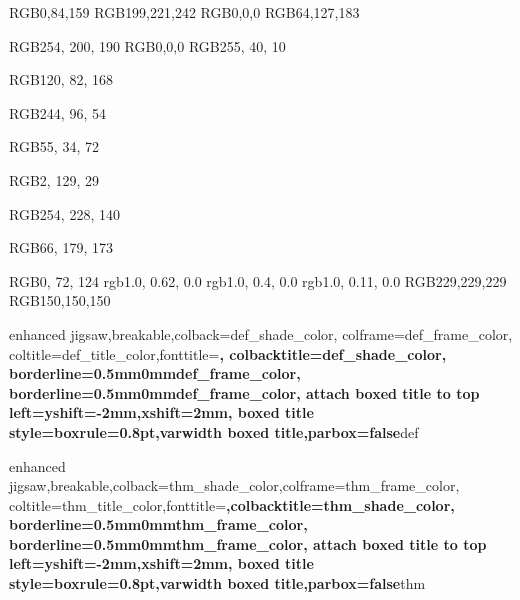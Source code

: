 
\definecolor{def_color}			{RGB}{0,84,159}
\definecolor{def_shade_color}	{RGB}{199,221,242}
\definecolor{def_title_color}	{RGB}{0,0,0}
\definecolor{def_frame_color}	{RGB}{64,127,183}


\definecolor{thm_shade_color}	{RGB}{254, 200, 190}
\definecolor{thm_title_color}	{RGB}{0,0,0}
\definecolor{thm_frame_color}	{RGB}{255, 40, 10}


\definecolor{Corollary_color}   {RGB}{120, 82, 168}

\definecolor{Remark_color}      {RGB}{244, 96, 54}

\definecolor{AltTheorem_color}  {RGB}{55, 34, 72}

\definecolor{Example_color}     {RGB}{2, 129, 29}

\definecolor{Lemma_color}       {RGB}{254, 228, 140}

\definecolor{Proposition_color} {RGB}{66, 179, 173}

\definecolor{indigo_dye}        {RGB}{0, 72, 124}
\definecolor{orangepeel}        {rgb}{1.0, 0.62, 0.0}
\definecolor{blazeorange}       {rgb}{1.0, 0.4, 0.0}
\definecolor{ferrarired}        {rgb}{1.0, 0.11, 0.0}
\definecolor{fouriergray}       {RGB}{229,229,229}
\definecolor{darkfouriergray}       {RGB}{150,150,150}



{enhanced jigsaw,breakable,colback=def_shade_color, colframe=def_frame_color,
coltitle=def_title_color,fonttitle=\bfseries, colbacktitle=def_shade_color,
borderline={0.5mm}{0mm}{def_frame_color},
borderline={0.5mm}{0mm}{def_frame_color},
attach boxed title to top left={yshift=-2mm,xshift=2mm},
boxed title style={boxrule=0.8pt},varwidth boxed title,parbox=false}{def}



{enhanced jigsaw,breakable,colback=thm_shade_color,colframe=thm_frame_color,
coltitle=thm_title_color,fonttitle=\bfseries ,colbacktitle=thm_shade_color,
borderline={0.5mm}{0mm}{thm_frame_color},
borderline={0.5mm}{0mm}{thm_frame_color},
attach boxed title to top left={yshift=-2mm,xshift=2mm},
boxed title style={boxrule=0.8pt},varwidth boxed title,parbox=false}{thm}



